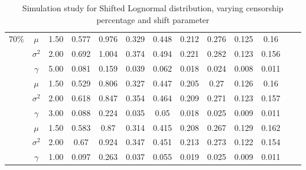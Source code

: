 \documentclass[10pt,a4paper,onecolumn]{article} %
\begin{document}
\begin{table}[H]
\begin{tabular}{ccccccccccccc}
\hline
70\% & $\mu$ & 1.50 & 0.577 & 0.976 & 0.329 & 0.448 & 0.212 & 0.276 & 0.125 & 0.16 \\ 
   & $\sigma^2$ & 2.00 & 0.692 & 1.004 & 0.374 & 0.494 & 0.221 & 0.282 & 0.123 & 0.156 \\ 
   & $\gamma$ & 5.00 & 0.081 & 0.159 & 0.039 & 0.062 & 0.018 & 0.024 & 0.008 & 0.011 \\ \cmidrule{2-11}
   & $\mu$ & 1.50 & 0.529 & 0.806 & 0.327 & 0.447 & 0.205 & 0.27 & 0.126 & 0.16 \\ 
   & $\sigma^2$ & 2.00 & 0.618 & 0.847 & 0.354 & 0.464 & 0.209 & 0.271 & 0.123 & 0.157 \\ 
   & $\gamma$ & 3.00 & 0.088 & 0.224 & 0.035 & 0.05 & 0.018 & 0.025 & 0.009 & 0.011 \\ \cmidrule{2-11}
   & $\mu$ & 1.50 & 0.583 & 0.87 & 0.314 & 0.415 & 0.208 & 0.267 & 0.129 & 0.162 \\ 
   & $\sigma^2$ & 2.00 & 0.67 & 0.924 & 0.347 & 0.451 & 0.213 & 0.273 & 0.122 & 0.154 \\ 
   & $\gamma$ & 1.00 & 0.097 & 0.263 & 0.037 & 0.055 & 0.019 & 0.025 & 0.009 & 0.011 \\ 
   \hline
\end{tabular}
\caption{Simulation study for Shifted Lognormal distribution, varying censorship percentage and shift parameter}\label{Simulation_Lognormal}
\end{table}
\end{document}
